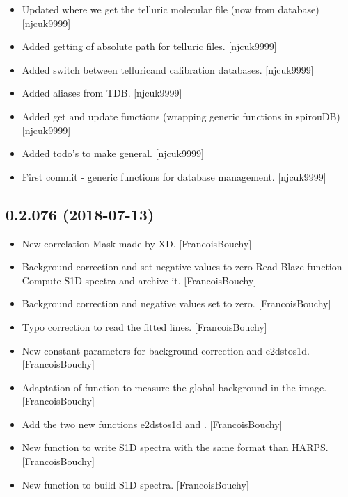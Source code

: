 \documentclass[a4paper,10pt,english]{report}
\begin{document}
\begin{itemize}
\item {} 
Updated where we get the telluric molecular file (now from database)
{[}njcuk9999{]}

\item {} 
Added getting of absolute path for telluric files. {[}njcuk9999{]}

\item {} 
Added switch between telluricand calibration databases. {[}njcuk9999{]}

\item {} 
Added aliases from TDB. {[}njcuk9999{]}

\item {} 
Added get and update functions (wrapping generic functions in
spirouDB) {[}njcuk9999{]}

\item {} 
Added todo’s to make general. {[}njcuk9999{]}

\item {} 
First commit - generic functions for database management. {[}njcuk9999{]}

\end{itemize}


\subsection{0.2.076 (2018-07-13)}
\label{\detokenize{misc/changelog:id395}}\begin{itemize}
\item {} 
New correlation Mask made by XD. {[}FrancoisBouchy{]}

\item {} 
Background correction and set negative values to zero Read Blaze
function Compute S1D spectra and archive it. {[}FrancoisBouchy{]}

\item {} 
Background correction and negative values set to zero.
{[}FrancoisBouchy{]}

\item {} 
Typo correction to read the fitted lines. {[}FrancoisBouchy{]}

\item {} 
New constant parameters for background correction and e2dstos1d.
{[}FrancoisBouchy{]}

\item {} 
Adaptation of function to measure the global background in the image.
{[}FrancoisBouchy{]}

\item {} 
Add the two new functions e2dstos1d and . {[}FrancoisBouchy{]}

\item {} 
New function to write S1D spectra with the same format than HARPS.
{[}FrancoisBouchy{]}

\item {} 
New function to build S1D spectra. {[}FrancoisBouchy{]}

\end{itemize}
\end{document}
